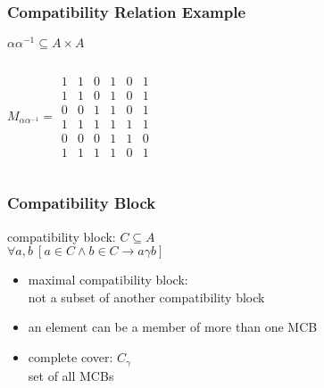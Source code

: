 \documentclass[dvipsnames]{beamer}
\begin{document}
\begin{frame}
  \frametitle{Compatibility Relation Example}

  \begin{example}
    $\alpha \alpha^{-1} \subseteq A \times A$

    \begin{columns}
      \[
        M_{\alpha \alpha^{-1}} =
          \begin{array}{|cccccc|}
            1  &  1  &  0  &  1  &  0  &  1\\
            1  &  1  &  0  &  1  &  0  &  1\\
            0  &  0  &  1  &  1  &  0  &  1\\
            1  &  1  &  1  &  1  &  1  &  1\\
            0  &  0  &  0  &  1  &  1  &  0\\
            1  &  1  &  1  &  1  &  0  &  1
          \end{array}
      \]

      \begin{center}
      \end{center}
    \end{columns}
  \end{example}
\end{frame}

\begin{frame}
  \frametitle{Compatibility Block}

  \begin{definition}
    \alert{compatibility block}: $C \subseteq A$\\
      $\forall a,b~[a \in C \wedge b \in C \rightarrow a \gamma b]$
  \end{definition}

  \pause
  \medskip
  \begin{itemize}
    \item \alert{maximal compatibility block}:\\
      not a subset of another compatibility block
    \item an element can be a member of more than one MCB

    \pause
    \medskip
    \item \alert{complete cover}: $C_\gamma$\\
      set of all MCBs
  \end{itemize}
\end{frame}
\end{document}
